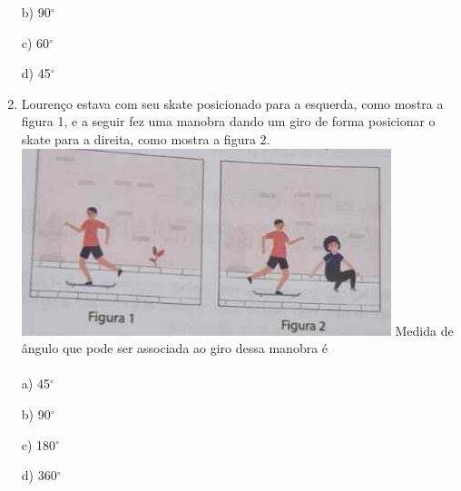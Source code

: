 \documentclass[a4paper,14pt]{article}
\begin{document}
\begin{multicols}{2}
\begin{enumerate}
        	b) 90$^\circ$
        	
        	c) 60$^\circ$
        	
        	d) 45$^\circ$
        	
        	\item Lourenço estava com seu skate posicionado para a esquerda, como mostra a figura 1, e a seguir fez uma manobra dando um giro de forma posicionar o skate para a direita, como mostra a figura 2.
        	\includegraphics[width=1\linewidth]{1MMA01_imagens/imagem02}
        	Medida de ângulo que pode ser associada ao giro dessa manobra é \\\\
        	a) 45$^\circ$
        	
        	b) 90$^\circ$
        	
        	c) 180$^\circ$
        	
        	d) 360$^\circ$ 
        	

\end{enumerate}
\end{multicols}
\end{document}
